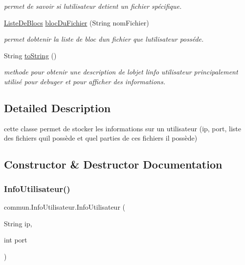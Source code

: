 \begin{DoxyCompactItemize}
\begin{DoxyCompactList}\small\item\em permet de savoir si l\textquotesingle{}utilisateur detient un fichier spécifique. \end{DoxyCompactList}\item 
\hyperlink{classcommun_1_1ListeDeBlocs}{Liste\+De\+Blocs} \hyperlink{classcommun_1_1InfoUtilisateur_a9f1e697ade23c76e070c55e03492b085}{bloc\+Du\+Fichier} (String nom\+Fichier)
\begin{DoxyCompactList}\small\item\em permet d\textquotesingle{}obtenir la liste de bloc d\textquotesingle{}un fichier que l\textquotesingle{}utilisateur posséde. \end{DoxyCompactList}\item 
\mbox{\label{classcommun_1_1InfoUtilisateur_af24c4b39eb5d42019c658e37819a2395}} 
String \hyperlink{classcommun_1_1InfoUtilisateur_af24c4b39eb5d42019c658e37819a2395}{to\+String} ()
\begin{DoxyCompactList}\small\item\em methode pour obtenir une description de l\textquotesingle{}objet l\textquotesingle{}info utilisateur principalement utilisé pour debuger et pour afficher des informations. \end{DoxyCompactList}\end{DoxyCompactItemize}


\subsection{Detailed Description}
cette classe permet de stocker les informations sur un utilisateur (ip, port, liste des fichiers qu\textquotesingle{}il possède et quel parties de ces fichiers il possède) 

\subsection{Constructor \& Destructor Documentation}
\mbox{\label{classcommun_1_1InfoUtilisateur_aaa6fb8bb0211678aad4fe5343d36485e}} 
\subsubsection{\texorpdfstring{Info\+Utilisateur()}{InfoUtilisateur()}}
{\footnotesize\ttfamily commun.\+Info\+Utilisateur.\+Info\+Utilisateur (\begin{DoxyParamCaption}\item[{String}]{ip,  }\item[{int}]{port }\end{DoxyParamCaption})\hspace{0.3cm}{\ttfamily [inline]}}



